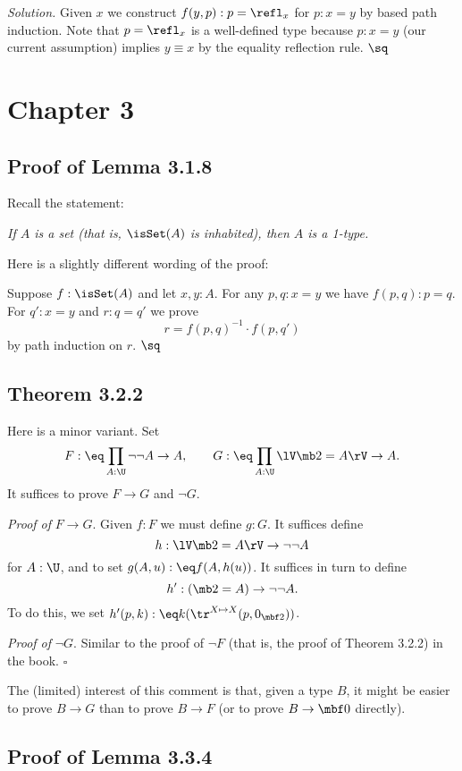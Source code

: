 \documentclass[12pt]{article}
\begin{document}
\nn\emph{Solution.} Given $x$ we construct $f(y,p):p=\refl_x$ for $p:x=y$ by based path induction. Note that $p=\refl_x$ is a well-defined type because $p:x=y$ (our current assumption) implies $y\equiv x$ by the equality reflection rule. $\sq$


\section{Chapter 3}

\subsection{Proof of Lemma 3.1.8}\label{318}

Recall the statement: 

\emph{If $A$ is a set (that is, $\isSet(A)$ is inhabited), then $A$ is a 1-type.} 

Here is a slightly different wording of the proof:

Suppose $f:\isSet(A)$ and let $x,y:A$. For any $p,q:x=y$ we have $f(p,q):p=q$. For $q':x=y$ and $r:q=q'$ we prove 
$$
r=f(p,q)^{-1}\cdot f(p,q')
$$ 
by path induction on $r$. $\sq$


\subsection{Theorem 3.2.2} 

Here is a minor variant. Set 
$$
F:\eq\prod_{A:\U}\neg\neg A\to A,\qquad G:\eq\prod_{A:\U}\lV\mb2=A\rV\to A.
$$ 
It suffices to prove $F\to G$ and $\neg G$. 

\nn\emph{Proof of} $F\to G$. Given $f:F$ we must define $g:G$. It suffices define 
$$
h:\lV\mb2=A\rV\to\neg\neg A
$$ 
for $A:\U$, and to set $g(A,u):\eq f(A,h(u))$. It suffices in turn to define 
$$
h':(\mb2=A)\to\neg\neg A.
$$ 
To do this, we set $h'(p,k):\eq k(\tr^{X\mapsto X}(p,0_{\mbf2}))$. 

\nn\emph{Proof of} $\neg G$. Similar to the proof of $\neg F$ (that is, the proof of Theorem 3.2.2) in the book. $\square$

The (limited) interest of this comment is that, given a type $B$, it might be easier to prove $B\to G$ than to prove $B\to F$ (or to prove $B\to\mbf0$ directly). 


\subsection{Proof of Lemma 3.3.4}
\end{document}
